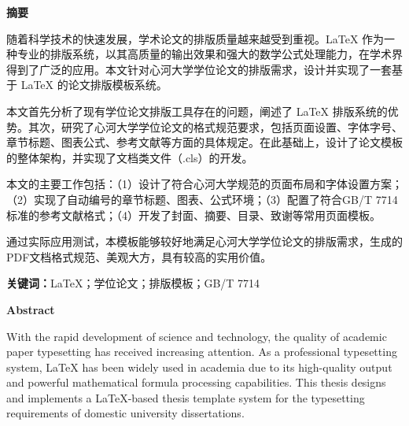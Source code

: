 
\begin{center}
    {\sanhao\sffamily\bfseries 摘\quad 要}
\end{center}

\vspace{0.5cm}

随着科学技术的快速发展，学术论文的排版质量越来越受到重视。LaTeX 作为一种专业的排版系统，以其高质量的输出效果和强大的数学公式处理能力，在学术界得到了广泛的应用。本文针对心河大学学位论文的排版需求，设计并实现了一套基于 LaTeX 的论文排版模板系统。

本文首先分析了现有学位论文排版工具存在的问题，阐述了 LaTeX 排版系统的优势。其次，研究了心河大学学位论文的格式规范要求，包括页面设置、字体字号、章节标题、图表公式、参考文献等方面的具体规定。在此基础上，设计了论文模板的整体架构，并实现了文档类文件（.cls）的开发。

本文的主要工作包括：（1）设计了符合心河大学规范的页面布局和字体设置方案；（2）实现了自动编号的章节标题、图表、公式环境；（3）配置了符合GB/T 7714标准的参考文献格式；（4）开发了封面、摘要、目录、致谢等常用页面模板。

通过实际应用测试，本模板能够较好地满足心河大学学位论文的排版需求，生成的PDF文档格式规范、美观大方，具有较高的实用价值。

\vspace{40pt}
\indent\textbf{关键词：}LaTeX；学位论文；排版模板；GB/T 7714

\newpage

\begin{center}
    {\sanhao\bfseries Abstract}
\end{center}

\vspace{0.5cm}

With the rapid development of science and technology, the quality of academic paper typesetting has received increasing attention. As a professional typesetting system, LaTeX has been widely used in academia due to its high-quality output and powerful mathematical formula processing capabilities. This thesis designs and implements a LaTeX-based thesis template system for the typesetting requirements of domestic university dissertations.

